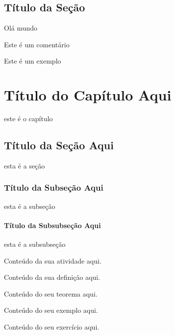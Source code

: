\section{Título da Seção}

\begin{definition}
    Olá mundo
\end{definition}

\begin{remark}
    Este é um comentário
\end{remark}

\begin{example}
    Este é um exemplo
\end{example}

\chapter{Título do Capítulo Aqui}
este é o capítulo
\section{Título da Seção Aqui}
esta é a seção
\subsection{Título da Subseção Aqui}
esta é a subseção
\subsubsection{Título da Subsubseção Aqui}
esta é a subsubseção
\begin{activity}
Conteúdo da sua atividade aqui.
\end{activity}

\begin{definition}
Conteúdo da sua definição aqui.
\end{definition}

\begin{theorem}
Conteúdo do seu teorema aqui.
\end{theorem}

\begin{example}
Conteúdo do seu exemplo aqui.
\end{example}

\begin{exercise}
Conteúdo do seu exercício aqui.
\end{exercise}

